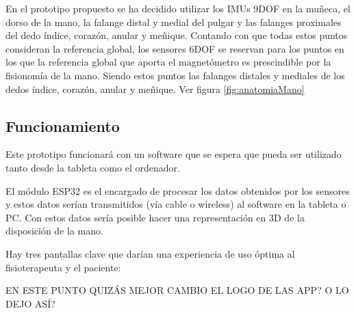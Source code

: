 En el prototipo propuesto se ha decidido utilizar los IMUs 9DOF en la muñeca, el dorso de la mano, la falange distal y medial del pulgar y las falanges proximales del dedo índice, corazón, anular y meñique. Contando con que todas estos puntos consideran la referencia global, los sensores 6DOF se reservan para los puntos en los que la referencia global que aporta el magnetómetro es prescindible por la fisionomía de la mano. Siendo estos puntos las falanges distales y mediales de los dedos índice, corazón, anular y meñique. Ver figura \ref{fig:anatomiaMano}


\subsection{Funcionamiento}
\label{sec:funcionamiento4}

Este prototipo funcionará con un software que se espera que pueda ser utilizado tanto desde la tableta como el ordenador. 

El módulo ESP32 es el encargado de procesar los datos obtenidos por los sensores y estos datos serían transmitidos (vía cable o wireless) al software en la tableta o PC. Con estos datos sería posible hacer una representación en 3D de la disposición de la mano. 

Hay tres pantallas clave que darían una experiencia de uso óptima al fisioterapeuta y el paciente:

\textcolor{rositaoscuro}{EN ESTE PUNTO QUIZÁS MEJOR CAMBIO EL LOGO DE LAS APP? O LO DEJO ASÍ?}

